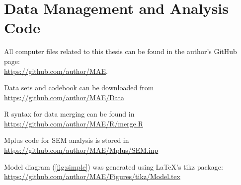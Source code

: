 \section{Data Management and Analysis Code}
\label{app:B}

\MAEindent

All computer files related to this thesis can be found in the author's GitHub page:\\
\href{https://github.com/author/MAE}{https://github.com/author/MAE}.

\begin{MAEitemize}
\item Data sets and codebook can be downloaded from \href{https://github.com/author/MAE/Data}{https://github.com/author/MAE/Data}
\item R syntax for data merging can be found in \href{https://github.com/author/MAE/R/merge.R}{https://github.com/author/MAE/R/merge.R}
\item Mplus code for SEM analysis is stored in \href{https://github.com/author/MAE/Mplus/SEM.inp}{https://github.com/author/MAE/Mplus/SEM.inp}
\item Model diagram (\cref{fig:simple}) was generated using \LaTeX's tikz package: \href{https://github.com/author/MAE/Figures/tikz/Model.tex}{https://github.com/author/MAE/Figures/tikz/Model.tex}
\end{MAEitemize}

